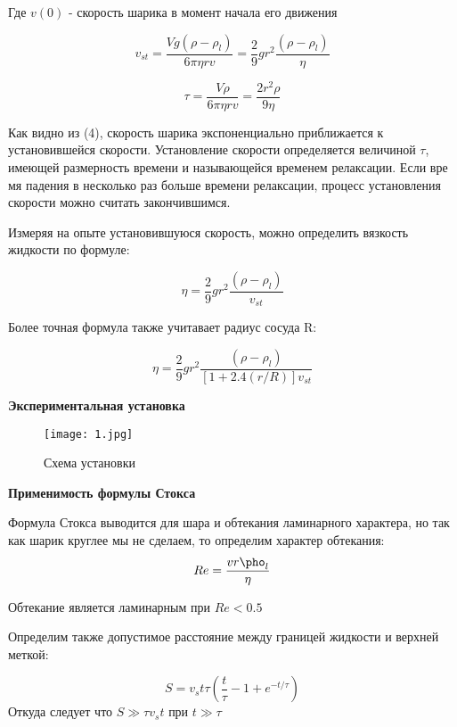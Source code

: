 \documentclass{article}
\begin{document}
Где $v(0)$ - скорость шарика в момент начала его движения

\begin{equation}
    v_{st} = \frac{V g (\rho - \rho_{l} )}{6 \pi \eta r v}
    = \frac{2}{9} g r^2 \frac{(\rho - \rho_{l} )}{\eta}
\end{equation}

\begin{equation}
    \tau = \frac{V \rho}{6 \pi \eta r v} = \frac{2 r^2 \rho}{9 \eta}
\end{equation}

Как видно из (4), скорость шарика экспоненциально приближается к установившейся скорости. Установление скорости определяется величиной $\tau$, имеющей размерность времени и называющейся временем релаксации. Если вре
мя падения в несколько раз больше времени релаксации, процесс установления скорости можно считать закончившимся.

Измеряя на опыте установившуюся скорость, можно определить вязкость жидкости по формуле:

\begin{equation}
    \eta = \frac{2}{9} g r^2 \frac{(\rho - \rho_{l} )}{v_{st}}
\end{equation}

Более точная формула также учитавает радиус сосуда R:

\begin{equation}
    \eta = \frac{2}{9} g r^2 \frac{(\rho - \rho_{l} )}{[1+2.4(r/R)]v_{st}}
\end{equation}

\textbf{Экспериментальная установка}
\begin{figure}[htp]
    \centering
    \texttt{[image: 1.jpg]}
    \caption{Схема установки}
\end{figure}
\newpage
\textbf{Применимость формулы Стокса}

Формула Стокса выводится для шара и обтекания ламинарного характера, но так как шарик круглее мы не сделаем, то определим характер обтекания:
\begin{equation}
    Re = \frac{v r \pho_l}{\eta}
\end{equation}

Обтекание является ламинарным при $Re < 0.5$

Определим также допустимое расстояние между границей жидкости и верхней меткой:

\begin{equation}
    S = v_st \tau (\frac{t}{\tau} - 1 + e^{-t/\tau})
\end{equation}
Откуда следует что $S \gg \tau v_st$ при $t \gg \tau$
\end{document}
